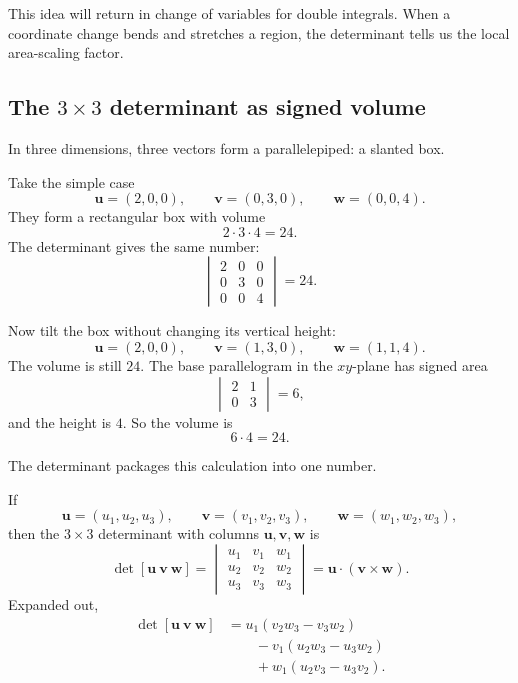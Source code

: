 This idea will return in change of variables for double integrals.  When a coordinate
change bends and stretches a region, the determinant tells us the local area-scaling
factor.

\subsection{The \(3\times3\) determinant as signed volume}

In three dimensions, three vectors form a parallelepiped: a slanted box.

Take the simple case
\[
    \mathbf u=(2,0,0),
    \qquad
    \mathbf v=(0,3,0),
    \qquad
    \mathbf w=(0,0,4).
\]
They form a rectangular box with volume
\[
    2\cdot3\cdot4=24.
\]
The determinant gives the same number:
\[
    \begin{vmatrix}
        2 & 0 & 0\\
        0 & 3 & 0\\
        0 & 0 & 4
    \end{vmatrix}
    =
    24.
\]

Now tilt the box without changing its vertical height:
\[
    \mathbf u=(2,0,0),
    \qquad
    \mathbf v=(1,3,0),
    \qquad
    \mathbf w=(1,1,4).
\]
The volume is still \(24\).  The base parallelogram in the \(xy\)-plane has signed area
\[
    \begin{vmatrix}
        2 & 1\\
        0 & 3
    \end{vmatrix}
    =
    6,
\]
and the height is \(4\).  So the volume is
\[
    6\cdot4=24.
\]

The determinant packages this calculation into one number.

\begin{definition}
If
\[
    \mathbf u=(u_1,u_2,u_3),
    \qquad
    \mathbf v=(v_1,v_2,v_3),
    \qquad
    \mathbf w=(w_1,w_2,w_3),
\]
then the \(3\times3\) determinant with columns \(\mathbf u,\mathbf v,\mathbf w\) is
\[
\boxed{
\det[\mathbf u\ \mathbf v\ \mathbf w]
=
\begin{vmatrix}
u_1 & v_1 & w_1\\
u_2 & v_2 & w_2\\
u_3 & v_3 & w_3
\end{vmatrix}
=
\mathbf u\cdot(\mathbf v\times\mathbf w).
}
\]
Expanded out,
\[
\begin{aligned}
\det[\mathbf u\ \mathbf v\ \mathbf w]
&=
u_1(v_2w_3-v_3w_2)\\
&\qquad
-v_1(u_2w_3-u_3w_2)\\
&\qquad
+w_1(u_2v_3-u_3v_2).
\end{aligned}
\]
\end{definition}

